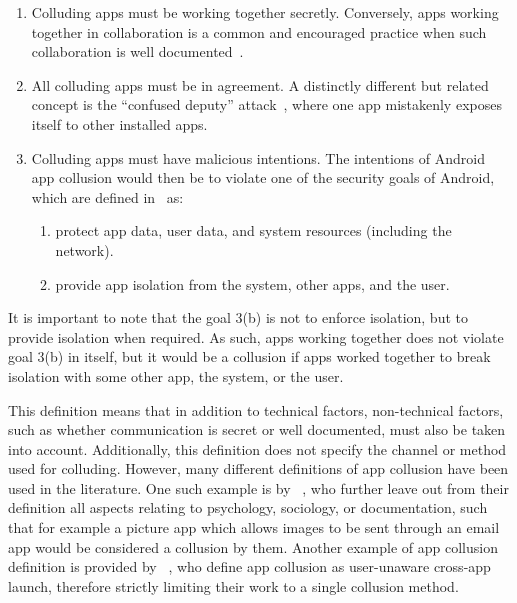 \documentclass[article]{aaltoseries}
\begin{document}
\begin{enumerate}
	
	\item Colluding apps must be working together secretly. Conversely, apps working together in collaboration is a common and encouraged practice when such collaboration is well documented~\cite[\href{https://developer.android.com/training/basics/intents}{``Interacting with Other Apps''}]{AOSPdeveloper}.

	\item All colluding apps must be in agreement. A distinctly different but related concept is the ``confused deputy'' attack~\cite{Hardy1988}, where one app mistakenly exposes itself to other installed apps.

	\item Colluding apps must have malicious intentions. The intentions of Android app collusion would then be to violate one of the security goals of Android, which are defined in~\cite{AOSPsecurity} as:
	\begin{enumerate}[nosep]
		\item protect app data, user data, and system resources (including the network).
		\item provide app isolation from the system, other apps, and the user.
	\end{enumerate}
\end{enumerate}

It is important to note that the goal 3(b) is not to enforce isolation, but to provide isolation when required. As such, apps working together does not violate goal 3(b) in itself, but it would be a collusion if apps worked together to break isolation with some other app, the system, or the user.

This definition means that in addition to technical factors, non-technical factors, such as whether communication is secret or well documented, must also be taken into account. Additionally, this definition does not specify the channel or method used for colluding. However, many different definitions of app collusion have been used in the literature. One such example is by \citeauthor{Asavoae2017}~\cite{Asavoae2017}, who further leave out from their definition all aspects relating to psychology, sociology, or documentation, such that for example a picture app which allows images to be sent through an email app would be considered a collusion by them. Another example of app collusion definition is provided by \citeauthor{Xu2017}~\cite{Xu2017}, who define app collusion as user-unaware cross-app launch, therefore strictly limiting their work to a single collusion method.
\end{document}

